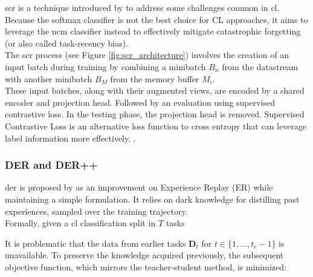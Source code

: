 \acrfull{scr} is a technique introduced by \citep{mai2021supervised} to address some challenges common in \acrshort{cl}. 
Because the softmax classifier is not the best choice for CL approaches, it aims to leverage the \acrfull{ncm} classifier instead to effectively mitigate catastrophic forgetting (or also called task-recency bias).\\
The \acrshort{scr} process (see Figure \ref{fig:scr_architecture}) involves the creation of an input batch during training by combining a minibatch $B_{n}$ from the datastream with another minibatch $B_{M}$ from the memory buffer $M_{i}$.\\ 
These input batches, along with their augmented views, are encoded by a shared encoder  and projection head. Followed by an evaluation using supervised contrastive loss. In the testing phase, the projection head is removed. Supervised Contrastive Loss is an alternative loss function to cross entropy that can leverage label information more effectively. \citep{khosla2020supervised}.

\subsubsection{DER and DER++}
\acrfull{der} is proposed by \citep{buzzega2020dark} as an improvement on Experience Replay (ER) while maintaining a simple formulation. It relies on dark knowledge for distilling past experiences, sampled over the training trajectory. \\
Formally, given a \acrshort{cl} classification split in $T$ tasks

It is problematic that the data from earlier tasks $\mathbf{D}_{t}$ for $t \in \{ 1, \dots, t_{c} - 1 \}$ is unavailable. To preserve the knowledge acquired previously, the subsequent objective function, which mirrors the teacher-student method, is minimized:

